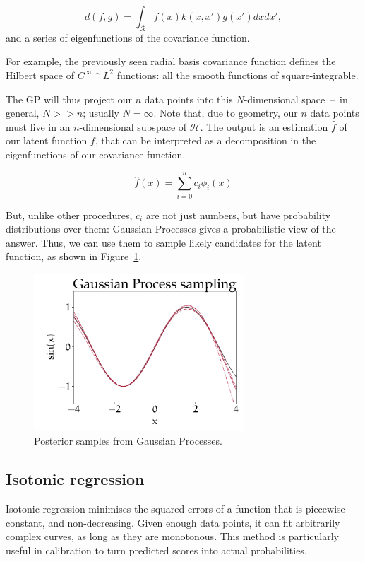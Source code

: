 	\[	d(f, g) =\int_{\mathcal{R}}  f(x) k(x, x') g(x') dx dx', \]
and a series of eigenfunctions of the covariance function.
	
For example, the previously seen radial basis covariance function defines the Hilbert space of $C^\infty \cap L^2$ functions: all the smooth functions of square-integrable.
	
The GP will thus project our $n$ data points into this $N$-dimensional space~--~in general, $N >> n$; usually $N = \infty$. Note that, due to geometry, our $n$ data points must live in an $n$-dimensional subspace of $\mathscr{H}$.
The output is an estimation $\hat f$ of our latent function $f$, that can be interpreted as a decomposition in the eigenfunctions of our covariance function.
	
	\[\hat f(x) = \sum_{i=0}^{n} c_i \phi_i(x)\]
	
But, unlike other procedures, $c_i$ are not just numbers, but have probability distributions over them:
Gaussian Processes gives a probabilistic view of the answer.
Thus, we can use them to sample likely candidates for the latent function, as shown in Figure~\ref{fig:gp_sampling}.
	
\begin{figure}[hbt]
\centering
	\includegraphics[width=0.7\textwidth]{machine_learning/figures/sin_samples}
	\caption{Posterior samples from Gaussian Processes.}\label{fig:gp_sampling}
\end{figure}

\subsection{Isotonic regression}
Isotonic regression minimises the squared errors of a function that is piecewise constant, and non-decreasing.
Given enough data points, it can fit arbitrarily complex curves, as long as they are monotonous.
This method is particularly useful in calibration to turn predicted scores into actual probabilities.

